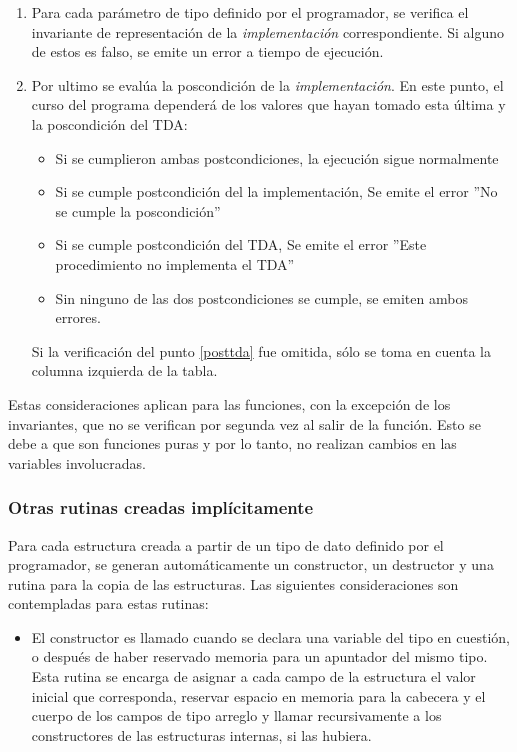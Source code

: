 {{\begin{enumerate}
  \item Para cada parámetro de tipo definido por el programador, se verifica el
  invariante de representación de la \textit{implementación} correspondiente. Si
  alguno de estos es falso, se emite un error a tiempo de ejecución.

  \item Por ultimo se evalúa la poscondición de la \textit{implementación}. En
  este punto, el curso del programa dependerá de los valores que hayan tomado
  esta última y la poscondición del TDA:
    \begin{itemize}
      \item Si se cumplieron ambas postcondiciones, la ejecución sigue normalmente
      \item Si se cumple postcondición del la implementación, Se emite el
      error ”No se cumple la poscondición”
      \item Si se cumple postcondición del TDA, Se emite el error ”Este
      procedimiento no implementa el TDA”
      \item Sin ninguno de las dos postcondiciones se cumple, se emiten ambos errores.
    \end{itemize}
  Si la verificación del punto \ref{posttda} fue omitida,
  sólo se toma en cuenta la columna izquierda de la tabla.

\end{enumerate}

Estas consideraciones aplican para las funciones, con la excepción de los
invariantes, que no se verifican por segunda vez al salir de la función. Esto se
debe a que son funciones puras y por lo tanto, no realizan cambios en las
variables involucradas.

\subsubsection{Otras rutinas creadas implícitamente}

Para cada estructura creada a partir de un tipo de dato definido por el programador,
se generan automáticamente un constructor, un destructor y una rutina para la
copia de las estructuras. Las siguientes consideraciones son contempladas para
estas rutinas:

\begin{itemize}

  \item El constructor es llamado cuando se declara una variable del tipo en
  cuestión, o después de haber reservado memoria para un apuntador del mismo
  tipo. Esta rutina se encarga de asignar a cada campo de la estructura el
  valor inicial que corresponda, reservar espacio en memoria para la cabecera
  y el cuerpo de los campos de tipo arreglo y llamar recursivamente a los
  constructores de las estructuras internas, si las hubiera.


\end{itemize}}}
